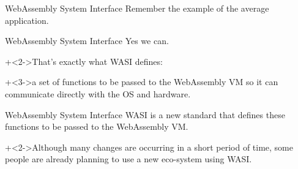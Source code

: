 \begin{frame}[t]{WebAssembly System Interface}{}
    Remember the example of the average application.
    \vspace{2ex}
    
\end{frame}


\begin{frame}{WebAssembly System Interface}{}
    {\Large Yes we can.}
    \vspace{4ex}

    \onslide+<2->{That's exactly what WASI defines:}
    \vspace{2ex}
    
    \onslide+<3->{a set of functions to be passed to the WebAssembly VM so it can communicate directly with the OS and hardware.} 
\end{frame}


\begin{frame}{WebAssembly System Interface}{}
    WASI is a new standard that defines these functions to be passed to the WebAssembly VM.
    \vspace{4ex}
    
    \onslide+<2->{Although many changes are occurring in a short period of time,
    some people are already planning to use a new eco-system using WASI.}
\end{frame}


